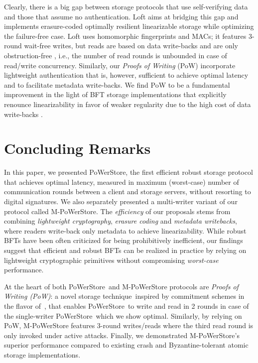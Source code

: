 \documentclass[10pt,conference,compsocconf]{IEEEtran}
\newcommand{\protocol}{PoWerStore}
\newcommand{\mprotocol}{M-PoWerStore}
\newcommand{\scheme}{storage technique}
\begin{document}
Clearly, there is a big gap between storage protocols that use self-verifying data and those that assume no authentication. Loft \cite{HendricksGR07} aims at bridging this gap and implements erasure-coded optimally resilient linearizable storage  while optimizing the failure-free case. Loft uses homomorphic fingerprints and MACs; it features 3-round wait-free writes, but reads are based on data write-backs and are only obstruction-free \cite{HLM03}, i.e., the number of read rounds is unbounded in case of read/write concurrency. Similarly, our \emph{Proofs of Writing} (PoW) incorporate lightweight authentication that is, however, sufficient to achieve optimal latency and to facilitate metadata write-backs. We find PoW to be a fundamental improvement in the light of BFT storage implementations that explicitly renounce linearizability in favor of weaker regularity due to the high cost of data write-backs \cite{BessaniCQAS11}.

\section{Concluding Remarks}
\label{sec:conclusion}

In this paper, we presented \protocol, the first efficient
robust storage protocol that achieves optimal latency, measured
in maximum (worst-case) number of communication rounds between a client and storage servers, without resorting to digital signatures.
We also separately presented a multi-writer variant of our protocol called \mprotocol.  The \emph{efficiency} of our proposals stems from combining \emph{lightweight cryptography}, \emph{erasure coding} and  \emph{metadata writebacks}, where readers write-back only metadata to achieve linearizability. While robust BFTs have been often criticized for being prohibitively inefficient, our findings suggest that efficient and robust BFTs can be realized
in practice by relying on lightweight cryptographic primitives without compromising \emph{worst-case} performance.

At the heart of both \protocol\ and \mprotocol{} protocols are \emph{Proofs of Writing (PoW)}: a novel \scheme\ inspired by commitment schemes in the flavor of~\cite{Halevi1996}, that enables \protocol\ to write and read in 2 rounds in case of the single-writer \protocol\ which we show optimal.
Similarly, by relying on PoW, \mprotocol{} features 3-round writes/reads where the third read round is only invoked under active attacks.
Finally, we  demonstrated \mprotocol's superior performance compared to existing crash and Byzantine-tolerant atomic storage implementations.
\end{document}
